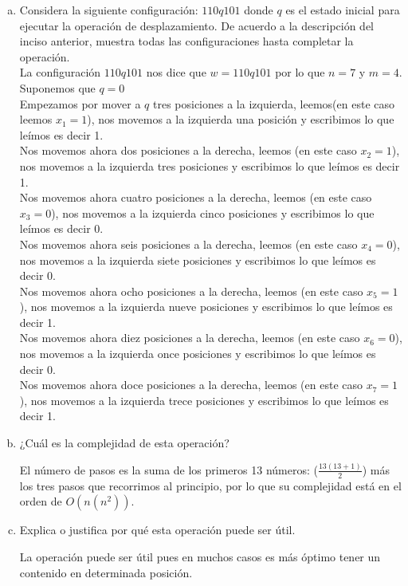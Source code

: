 \documentclass[12pt,letterpaper]{article}
\begin{document}
\begin{enumerate}[a.]
    \item Considera la siguiente configuración: $110q101$ donde $q$ es el estado inicial para ejecutar la operación de desplazamiento. De acuerdo a la descripción del inciso anterior, muestra todas las configuraciones hasta completar la operación.\\

La configuración $110q101$ nos dice que $w=110q101$ por lo que $n=7$ y $m=4$. Suponemos que $q=0$\\

Empezamos por mover a $q$ tres posiciones a la izquierda, leemos(en este caso leemos $x_1=1$), nos movemos a la izquierda una posición y escribimos lo que leímos es decir 1.\\

Nos movemos ahora dos posiciones a la derecha, leemos (en este caso $x_2=1$), nos movemos a la izquierda tres posiciones y escribimos lo que leímos es decir 1. \\

Nos movemos ahora cuatro posiciones a la derecha, leemos (en este caso $x_3=0$), nos movemos a la izquierda cinco posiciones y escribimos lo que leímos es decir 0. \\

Nos movemos ahora seis posiciones a la derecha, leemos (en este caso $x_4=0$), nos movemos a la izquierda siete posiciones y escribimos lo que leímos es decir 0. \\

Nos movemos ahora ocho posiciones a la derecha, leemos (en este caso $x_5=1$), nos movemos a la izquierda nueve posiciones y escribimos lo que leímos es decir 1. \\

Nos movemos ahora diez posiciones a la derecha, leemos (en este caso $x_6=0$), nos movemos a la izquierda once posiciones y escribimos lo que leímos es decir 0. \\

Nos movemos ahora doce posiciones a la derecha, leemos (en este caso $x_7=1$), nos movemos a la izquierda trece posiciones y escribimos lo que leímos es decir 1. \\
    
    \item ¿Cuál es la complejidad de esta operación?

El número de pasos es la suma de los primeros 13 números: ($\frac{13(13+1)}{2}$)  más los tres pasos que recorrimos al principio, por lo que su complejidad está en el orden de $O(n(n^2))$.
    
    \item Explica o justifica por qué esta operación puede ser útil.

La operación puede ser útil pues en muchos casos es más óptimo tener un contenido en determinada posición.
    
\end{enumerate}
\end{document}
